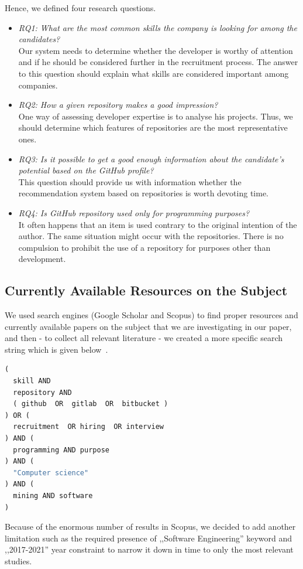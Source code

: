Hence, we defined four research questions.
\begin{itemize}
\item{\emph{RQ1: What are the most common skills the company is looking for among the candidates?}\\
  Our system needs to determine whether the developer is worthy of attention and if he should be considered further in the recruitment process. The answer to this question should explain what skills are considered important among companies. }
\item{\emph{RQ2: How a given repository makes a good impression?}\\
  One way of assessing developer expertise is to analyse his projects. Thus, we should determine which features of repositories are the most representative ones.} 
\item{\emph{RQ3: Is it possible to get a good enough information about the candidate's potential based on the GitHub profile?}\\
  This question should provide us with information whether the recommendation system based on repositories is worth devoting time.} 
\item{\emph{RQ4: Is GitHub repository used only for programming purposes?}\\
  It often happens that an item is used contrary to the original intention of the author. The same situation might occur with the repositories. There is no compulsion to prohibit the use of a repository for purposes other than development.}
\end{itemize}

\subsection{Currently Available Resources on the Subject}
We used search engines (Google Scholar and Scopus) to find proper resources and currently available papers on the subject that we are investigating in our paper, and then - to collect all relevant literature - we created a more specific search string which is given below~.

\begin{lstlisting}[language=Python, label={lst:search-string}]
(
  skill AND
  repository AND
  ( github  OR  gitlab  OR  bitbucket )
) OR (
  recruitment  OR hiring  OR interview
) AND (
  programming AND purpose
) AND (
  "Computer science"
) AND (
  mining AND software
)
\end{lstlisting}
Because of the enormous number of results in Scopus, we decided to add another limitation such as the required presence of ,,Software Engineering'' keyword and ,,2017-2021'' year constraint to narrow it down in time to only the most relevant studies.

